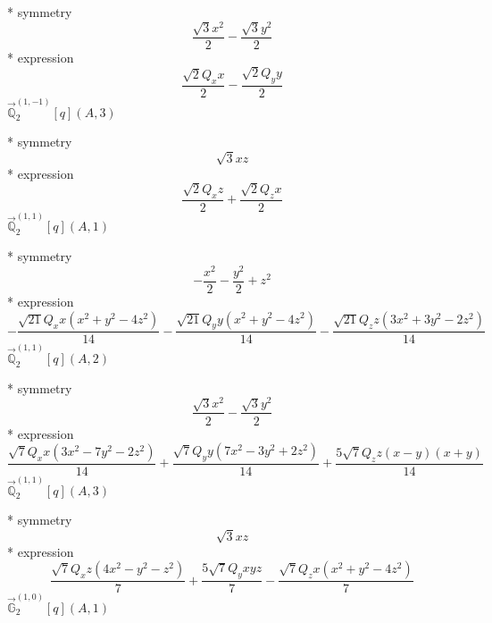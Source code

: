 \documentclass[fleqn,8pt]{jsarticle}
\begin{document}
\noindent\quad ** symmetry
\begin{dmath*}
\frac{\sqrt{3} x^{2}}{2} - \frac{\sqrt{3} y^{2}}{2}
\end{dmath*}
\noindent\quad ** expression
\begin{dmath*}
\frac{\sqrt{2} Q_{x} x}{2} - \frac{\sqrt{2} Q_{y} y}{2}
\end{dmath*}
\noindent\quad $\vec{\mathbb{Q}}_{2}^{(1,-1)}[q](A,3)$

\noindent\quad ** symmetry
\begin{dmath*}
\sqrt{3} x z
\end{dmath*}
\noindent\quad ** expression
\begin{dmath*}
\frac{\sqrt{2} Q_{x} z}{2} + \frac{\sqrt{2} Q_{z} x}{2}
\end{dmath*}
\noindent\quad $\vec{\mathbb{Q}}_{2}^{(1,1)}[q](A,1)$

\noindent\quad ** symmetry
\begin{dmath*}
- \frac{x^{2}}{2} - \frac{y^{2}}{2} + z^{2}
\end{dmath*}
\noindent\quad ** expression
\begin{dmath*}
- \frac{\sqrt{21} Q_{x} x \left(x^{2} + y^{2} - 4 z^{2}\right)}{14} - \frac{\sqrt{21} Q_{y} y \left(x^{2} + y^{2} - 4 z^{2}\right)}{14} - \frac{\sqrt{21} Q_{z} z \left(3 x^{2} + 3 y^{2} - 2 z^{2}\right)}{14}
\end{dmath*}
\noindent\quad $\vec{\mathbb{Q}}_{2}^{(1,1)}[q](A,2)$

\noindent\quad ** symmetry
\begin{dmath*}
\frac{\sqrt{3} x^{2}}{2} - \frac{\sqrt{3} y^{2}}{2}
\end{dmath*}
\noindent\quad ** expression
\begin{dmath*}
\frac{\sqrt{7} Q_{x} x \left(3 x^{2} - 7 y^{2} - 2 z^{2}\right)}{14} + \frac{\sqrt{7} Q_{y} y \left(7 x^{2} - 3 y^{2} + 2 z^{2}\right)}{14} + \frac{5 \sqrt{7} Q_{z} z \left(x - y\right) \left(x + y\right)}{14}
\end{dmath*}
\noindent\quad $\vec{\mathbb{Q}}_{2}^{(1,1)}[q](A,3)$

\noindent\quad ** symmetry
\begin{dmath*}
\sqrt{3} x z
\end{dmath*}
\noindent\quad ** expression
\begin{dmath*}
\frac{\sqrt{7} Q_{x} z \left(4 x^{2} - y^{2} - z^{2}\right)}{7} + \frac{5 \sqrt{7} Q_{y} x y z}{7} - \frac{\sqrt{7} Q_{z} x \left(x^{2} + y^{2} - 4 z^{2}\right)}{7}
\end{dmath*}
\noindent\quad $\vec{\mathbb{G}}_{2}^{(1,0)}[q](A,1)$
\end{document}
